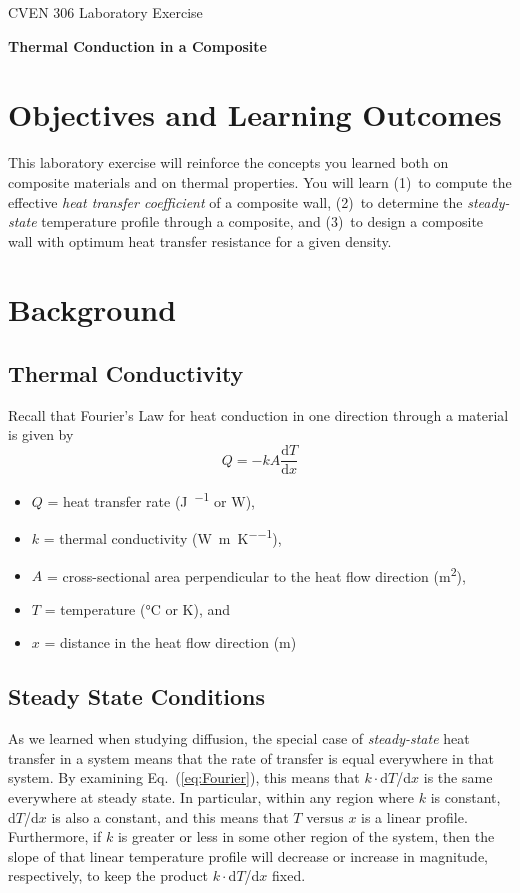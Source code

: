 \documentclass{article}
\newcommand{\oderiv}[2]{\ensuremath{\frac{\text{d}#1}{\text{d}#2}}}
\begin{document}
\allsectionsfont{\normalfont\sffamily\bfseries}
\begin{center}
    \large{CVEN 306 Laboratory Exercise}

    \Large{\textsf{\textbf{Thermal Conduction in a Composite}}}
\end{center}

\vspace{0.25truein}
\section*{Objectives and Learning Outcomes}
This laboratory exercise will reinforce the concepts you learned both on composite
materials and on thermal properties.  You will learn (1)~to compute the effective
\textit{heat transfer coefficient} of a composite wall, (2)~to determine the
\textit{steady-state} temperature profile through a composite, and (3)~to design
a composite wall with optimum heat transfer resistance for a given density.

\section*{Background}
\subsection*{Thermal Conductivity}
Recall that Fourier's Law for heat conduction
in one direction through a material is given by
\begin{equation}
    Q = -k A \oderiv{T}{x}
    \label{eq:Fourier}
\end{equation}
\begin{itemize}
    \item $Q$ = heat transfer rate (\si{\joule\per\sec} or \si{\watt}),
    \item $k$ = thermal conductivity (\si{\watt\per\meter\per\kelvin}),
    \item $A$ = cross-sectional area perpendicular to the heat flow direction (\si{\meter\squared}),
    \item $T$ = temperature (\si{\degreeCelsius} or \si{\kelvin}), and
    \item $x$ = distance in the heat flow direction (\si{\meter})
\end{itemize}

\subsection*{Steady State Conditions}
As we learned when studying diffusion, the special case of \textit{steady-state} heat transfer in 
a system means that the rate of transfer is equal everywhere in that system.
By examining Eq.~(\ref{eq:Fourier}), this means that $k\cdot$d$T$/d$x$ is the
same everywhere at steady state.  In particular, within any region where $k$ is
constant, d$T$/d$x$ is also a constant, and this means that $T$ versus $x$ is
a linear profile.  Furthermore, if $k$ is greater or less in some other region
of the system, then the slope of that linear temperature profile will decrease
or increase in magnitude, respectively, to keep the product $k\cdot$d$T$/d$x$ fixed.
\end{document}
